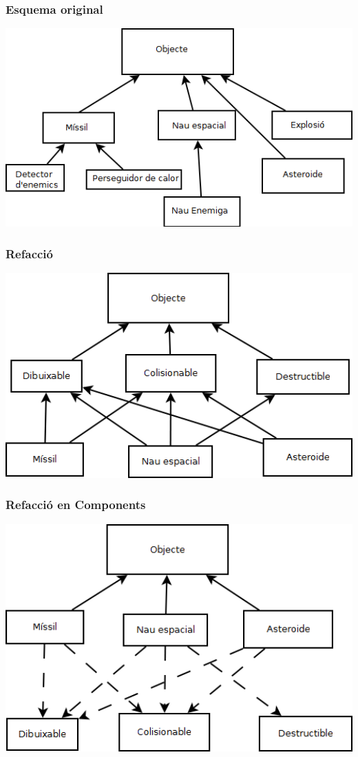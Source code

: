 \documentclass[serif,9pt]{beamer}
\begin{document}
    \begin{frame}\frametitle{Esquema original}
      \includegraphics[width=1.00\textwidth]{./img/DiagramaObjectes1.png}
    \end{frame}

    \begin{frame}\frametitle{Refacció}
      \includegraphics[width=1.00\textwidth]{./img/DiagramaObjectes2.png}
    \end{frame}

    \begin{frame}\frametitle{Refacció en Components}
      \includegraphics[width=1.00\textwidth]{./img/DiagramaObjectes3.png}
    \end{frame}
    
\end{document}
